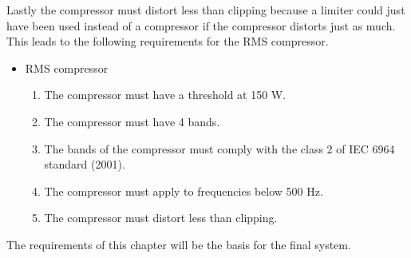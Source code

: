 Lastly the compressor must distort less than clipping because a limiter could just have been used instead of a compressor if the compressor distorts just as much. This leads to the following requirements for the RMS compressor.     

\begin{itemize}
\item RMS compressor
\begin{enumerate}
\item [\textlabel{9}{Threshold}] The compressor must have a threshold at 150 W.\\
\item [\textlabel{10}{bands}] The compressor must have 4 bands.\\
\item [\textlabel{11}{standardband}] The bands of the compressor must comply with the class 2 of IEC 6964 standard (2001).\\
\item [\textlabel{12}{500below}] The compressor must apply to frequencies below 500 Hz.\\
\item [\textlabel{13}{clipping}] The compressor must distort less than clipping.
\end{enumerate}
\end{itemize}

The requirements of this chapter will be the basis for the final system.




